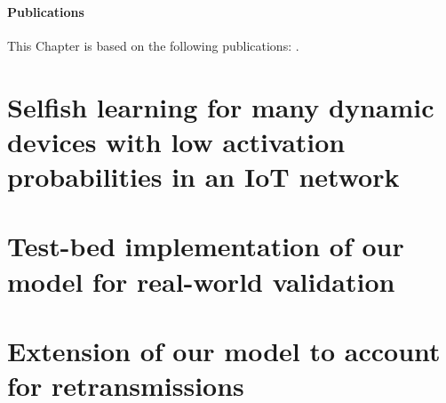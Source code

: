


\paragraph{Publications}
This Chapter is based on the following publications: \cite{Bonnefoi17,Besson2018ICT,Besson2019WCNC,Bonnefoi2019WCNC}.


\section{Selfish learning for many dynamic devices with low activation probabilities in an IoT network}
\label{sec:4:firstModel}





\section{Test-bed implementation of our model for real-world validation}
\label{sec:4:gnuradio}






\section{Extension of our model to account for retransmissions}
\label{sec:4:retransmissions}


